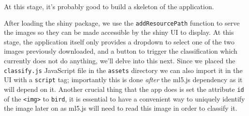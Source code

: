 \documentclass[
]{krantz}
\begin{document}
At this stage, it's probably good to build a skeleton of the application.

After loading the shiny package, we use the \texttt{addResourcePath} function to serve the images so they can be made accessible by the shiny UI to display. At this stage, the application itself only provides a dropdown to select one of the two images previously downloaded, and a button to trigger the classification which currently does not do anything, we'll delve into this next. Since we placed the \texttt{classify.js} JavaScript file in the \texttt{assets} directory we can also import it in the UI with a \texttt{script} tag; importantly this is done \emph{after} the ml5.js dependency as it will depend on it. Another crucial thing that the app does is set the attribute \texttt{id} of the \texttt{\textless{}img\textgreater{}} to \texttt{bird}, it is essential to have a convenient way to uniquely identify the image later on as ml5.js will need to read this image in order to classify it.
\end{document}
